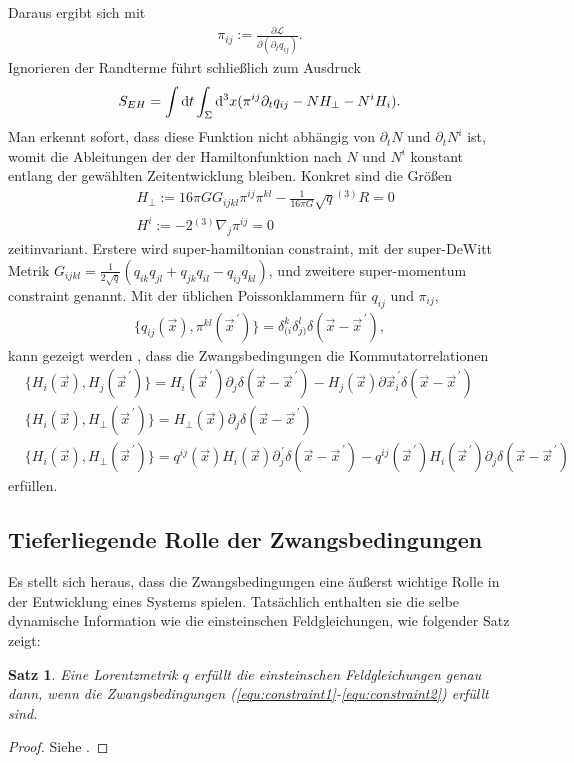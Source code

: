 \documentclass{scrartcl}
\newtheorem{theorem}{Satz}
\newcommand{\inHS}{{}^{(3)}\!}
\begin{document}
		Daraus ergibt sich mit
		\begin{align}
			\pi_{ij}:=\frac{\partial \mathcal{L}}{\partial(\partial_t q_{ij})}.
		\end{align}
		Ignorieren der Randterme führt schließlich zum Ausdruck
		\begin{align}
			S_{EH}=\int{\rm d}t\int_\Sigma {\rm d}^3x (\pi^{ij}\partial_t q_{ij}-NH_{\perp}-N^i H_i).
		\end{align}
		Man erkennt sofort, dass diese Funktion nicht abhängig von $\partial_t N$ und $\partial_t N^i$
		ist, womit die Ableitungen der der Hamiltonfunktion nach $N$ und $N^i$ konstant entlang der gewählten
		Zeitentwicklung bleiben. Konkret sind die Größen
		\begin{align}
			&H_{\perp}:=16\pi G G_{ijkl}\pi^{ij}\pi^{kl}-\frac{1}{16\pi G}\sqrt{q}\inHS R=0 \label{equ:constraint1}\\
			&H^i:=-2\inHS\nabla_j\pi^{ij}=0 \label{equ:constraint2}
		\end{align}
		zeitinvariant. Erstere wird super-hamiltonian constraint, mit der super-DeWitt Metrik $G_{ijkl}=\frac{1}{2\sqrt{q}}(q_{ik}q_{jl}+q_{jk}q_{il}-q_{ij}q_{kl})$,
		und zweitere super-momentum constraint genannt.
		Mit der üblichen Poissonklammern für $q_{ij}$ und $\pi_{ij}$,
		\begin{align}
			\{q_{ij}(\vec{x}),\pi^{kl}(\vec{x}^{\,\prime})\}=\delta^k_{(i}\delta^l_{j)}\delta(\vec{x}-\vec{x}^{\,\prime}),
		\end{align}
		kann gezeigt werden \cite{dirac2001lectures,cjm19510012}, dass die Zwangsbedingungen die Kommutatorrelationen \cite{qg06}
		\begin{align}
			&\{H_i(\vec{x}),H_j(\vec{x}^{\,\prime})\}=H_i(\vec{x}^{\,\prime})\partial_j\delta(\vec{x}-\vec{x}^{\,\prime})-H_j(\vec{x})\partial\vec{x}^{\,\prime}_i\delta(\vec{x}-\vec{x}^{\,\prime})\\
			&\{H_i(\vec{x}),H_\perp(\vec{x}^{\,\prime})\}=H_\perp(\vec{x})\partial_j\delta(\vec{x}-\vec{x}^{\,\prime})\\
			&\{H_i(\vec{x}),H_\perp(\vec{x}^{\,\prime})\}=q^{ij}(\vec{x})H_i(\vec{x})\partial^{\,\prime}_j\delta(\vec{x}-\vec{x}^{\,\prime})-q^{ij}(\vec{x}^{\,\prime})H_i(\vec{x}^{\,\prime})\partial_j\delta(\vec{x}-\vec{x}^{\,\prime})
		\end{align}
		erfüllen.
	\subsection{Tieferliegende Rolle der Zwangsbedingungen}
		Es stellt sich heraus, dass die Zwangsbedingungen eine äußerst wichtige Rolle in der
		Entwicklung eines Systems spielen. Tatsächlich enthalten sie die selbe dynamische
		Information wie die einsteinschen Feldgleichungen, wie folgender
		Satz zeigt:
		\begin{theorem}
			Eine Lorentzmetrik $q$ erf\"ullt die einsteinschen Feldgleichungen genau dann, wenn die
			Zwangsbedingungen (\ref{equ:constraint1}-\ref{equ:constraint2}) erf\"ullt sind.
			\label{thm:full}
		\end{theorem}
		\begin{proof}
			Siehe \cite{gr-qc/9210011}. %
		\end{proof}
\end{document}
